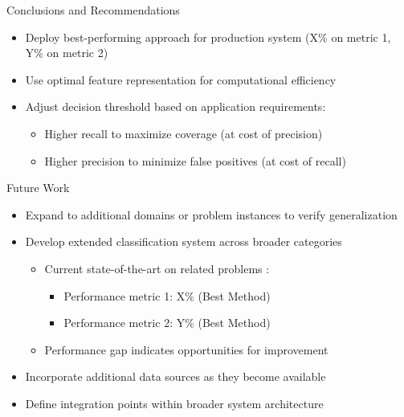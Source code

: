 \documentclass[
    10pt,
    aspectratio=169,
]{beamer}
\begin{document}

\begin{frame}{Conclusions and Recommendations}
\begin{itemize}
    \item Deploy best-performing approach for production system (X\% on metric 1, Y\% on metric 2)
    \item Use optimal feature representation for computational efficiency
    \item Adjust decision threshold based on application requirements:
    \begin{itemize}
        \item Higher recall to maximize coverage (at cost of precision)
        \item Higher precision to minimize false positives (at cost of recall)
    \end{itemize}
\end{itemize}

\end{frame}

\begin{frame}{Future Work}
\begin{itemize}
    \item Expand to additional domains or problem instances to verify generalization
    \item Develop extended classification system across broader categories
    \begin{itemize}
        \item Current state-of-the-art on related problems \cite{nguyen2023mimic}:
        \begin{itemize}
            \item Performance metric 1: X\% (Best Method)
            \item Performance metric 2: Y\% (Best Method)
        \end{itemize}
        \item Performance gap indicates opportunities for improvement
    \end{itemize}
    \item Incorporate additional data sources as they become available
    \item Define integration points within broader system architecture
\end{itemize}

\end{frame}
\end{document}
